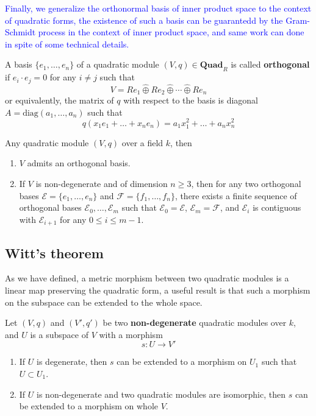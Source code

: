 \textcolor{blue}{Finally, we generalize the orthonormal basis of inner product space to the context of quadratic forms, the existence of such a basis can be guarantedd by the Gram-Schmidt process in the context of inner product space, and same work can done in spite of some technical details.}

\begin{definition}
    A basis \(\{e_1,\dots,e_n\}\) of a quadratic module \((V,q) \in \mathbf{Quad}_R\) is called \textbf{orthogonal} if \(e_i \cdot e_j = 0\) for any \(i \neq j\) such that
    \[V = Re_1 \hat{\oplus} Re_2 \hat{\oplus} \cdots \hat{\oplus} Re_n\]
    or equivalently, the matrix of \(q\) with respect to the basis is diagonal \(A = \mathrm{diag}(a_1,\dots,a_n)\) such that 
    \[q(x_1e_1+ \dots + x_n e_n) = a_1x_1^2+ \dots+ a_nx_n^2\]
\end{definition}

\begin{colortheorem}
    Any quadratic module \((V,q)\) over a field \(k\), then
    \begin{enumerate}
        \item \(V\) admits an orthogonal basis.
        \item If \(V\) is non-degenerate and of dimension \(n \geq 3\), then for any two orthogonal bases \(\mathcal{E} = \{e_1,\dots,e_n\} \) and \(\mathcal{F} = \{f_1,\dots,f_n\}\), there exists a finite sequence of orthogonal bases \(\mathcal{E}_0,\dots,\mathcal{E}_m\) such that \(\mathcal{E}_0 = \mathcal{E}\), \(\mathcal{E}_m = \mathcal{F}\), and \(\mathcal{E}_i\) is contiguous with \(\mathcal{E}_{i+1}\) for any \(0 \leq i \leq m-1\).
    \end{enumerate}  
\end{colortheorem}

\subsection{Witt's theorem}

As we have defined, a metric morphism between two quadratic modules is a linear map preserving the quadratic form, a useful result is that such a morphism on the subspace can be extended to the whole space.

\begin{colortheorem}
    Let \((V,q)\) and \((V',q')\) be two \textbf{non-degenerate} quadratic modules over \(k\), and \(U\) is a subspace of \(V\) with a morphism
    \[s: U \to V'\]
    \begin{enumerate}
        \item If \(U\) is degenerate, then \(s\) can be extended to a morphism on \(U_1\) such that \(U \subset U_1\).
        \item If \(U\) is non-degenerate and two quadratic modules are isomorphic, then \(s\) can be extended to a morphism on whole \(V\).
    \end{enumerate}
\end{colortheorem}

